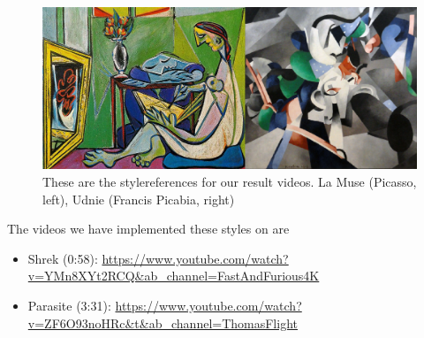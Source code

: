 \begin{figure}[!htb]
\begin{center}
\includegraphics[scale=0.27]{report/Result/images/picasso_and_udnie.png}
\caption{These are the stylereferences for our result videos. La Muse (Picasso, left), Udnie (Francis Picabia, right)}
\label{fig:architecture}
\end{center}
\end{figure}
The videos we have implemented these styles on are
\begin{itemize}
    \item Shrek (0:58): \url{https://www.youtube.com/watch?v=YMn8XYt2RCQ&ab_channel=FastAndFurious4K}
    \item Parasite (3:31): \url{https://www.youtube.com/watch?v=ZF6O93noHRc&t&ab_channel=ThomasFlight}
\end{itemize}